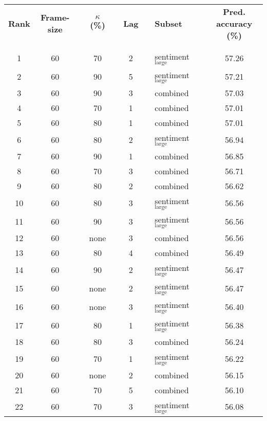 \documentclass{article}
\begin{document}
\begin{table}\
\centering
\begin{tabular}{cclclclllc}
\textbf{Rank} & \textbf{Frame-size} &  & $\kappa$ \textbf{(\%)} &  & \textbf{Lag} &  & \textbf{Subset} &  & \textbf{Pred. accuracy (\%)}\\
 &  &  &  &  &  &  &  &  & \\
\hline
 &  &  &  &  &  &  &  &  & \\
1 & 60 &  & 70 &  & 2 &  & sentiment$_{\text{large}}$ &  & 57.26\\
2 & 60 &  & 90 &  & 5 &  & sentiment$_{\text{large}}$ &  & 57.21\\
3 & 60 &  & 90 &  & 3 &  & combined &  & 57.03\\
4 & 60 &  & 70 &  & 1 &  & combined &  & 57.01\\
5 & 60 &  & 80 &  & 1 &  & combined &  & 57.01\\
6 & 60 &  & 80 &  & 2 &  & sentiment$_{\text{large}}$ &  & 56.94\\
7 & 60 &  & 90 &  & 1 &  & combined &  & 56.85\\
8 & 60 &  & 70 &  & 3 &  & combined &  & 56.71\\
9 & 60 &  & 80 &  & 2 &  & combined &  & 56.62\\
10 & 60 &  & 80 &  & 3 &  & sentiment$_{\text{large}}$ &  & 56.56\\
11 & 60 &  & 90 &  & 3 &  & sentiment$_{\text{large}}$ &  & 56.56\\
12 & 60 &  & none &  & 3 &  & combined &  & 56.56\\
13 & 60 &  & 80 &  & 4 &  & combined &  & 56.49\\
14 & 60 &  & 90 &  & 2 &  & sentiment$_{\text{large}}$ &  & 56.47\\
15 & 60 &  & none &  & 2 &  & sentiment$_{\text{large}}$ &  & 56.47\\
16 & 60 &  & none &  & 3 &  & sentiment$_{\text{large}}$ &  & 56.40\\
17 & 60 &  & 80 &  & 1 &  & sentiment$_{\text{large}}$ &  & 56.38\\
18 & 60 &  & 80 &  & 3 &  & combined &  & 56.24\\
19 & 60 &  & 70 &  & 1 &  & sentiment$_{\text{large}}$ &  & 56.22\\
20 & 60 &  & none &  & 2 &  & combined &  & 56.15\\
21 & 60 &  & 70 &  & 5 &  & combined &  & 56.10\\
22 & 60 &  & 70 &  & 3 &  & sentiment$_{\text{large}}$ &  & 56.08\\

\end{tabular}
\end{table}
\end{document}
